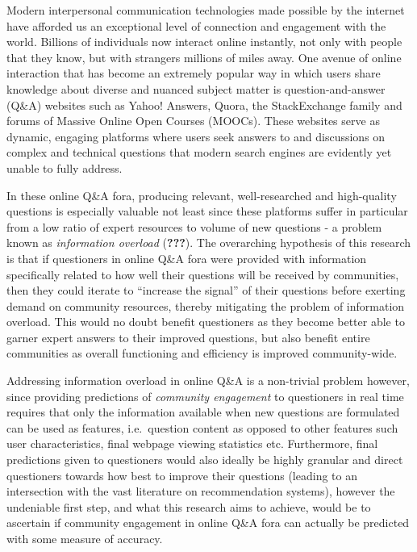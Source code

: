 \documentclass[11pt,preprint, authoryear]{article}
\numberwithin{equation}{section}
\begin{document}
Modern interpersonal communication technologies made possible by the
internet have afforded us an exceptional level of connection and
engagement with the world. Billions of individuals now interact online
instantly, not only with people that they know, but with strangers
millions of miles away. One avenue of online interaction that has become
an extremely popular way in which users share knowledge about diverse
and nuanced subject matter is question-and-answer (Q\&A) websites such
as Yahoo! Answers, Quora, the StackExchange family and forums of Massive
Online Open Courses (MOOCs). These websites serve as dynamic, engaging
platforms where users seek answers to and discussions on complex and
technical questions that modern search engines are evidently yet unable
to fully address.

In these online Q\&A fora, producing relevant, well-researched and
high-quality questions is especially valuable not least since these
platforms suffer in particular from a low ratio of expert resources to
volume of new questions - a problem known as \emph{information overload}
({\textbf{???}}). The overarching hypothesis of this research is that if
questioners in online Q\&A fora were provided with information
specifically related to how well their questions will be received by
communities, then they could iterate to ``increase the signal'' of their
questions before exerting demand on community resources, thereby
mitigating the problem of information overload. This would no doubt
benefit questioners as they become better able to garner expert answers
to their improved questions, but also benefit entire communities as
overall functioning and efficiency is improved community-wide.

Addressing information overload in online Q\&A is a non-trivial problem
however, since providing predictions of \emph{community engagement} to
questioners in real time requires that only the information available
when new questions are formulated can be used as features, i.e.~question
content as opposed to other features such user characteristics, final
webpage viewing statistics etc. Furthermore, final predictions given to
questioners would also ideally be highly granular and direct questioners
towards how best to improve their questions (leading to an intersection
with the vast literature on recommendation systems), however the
undeniable first step, and what this research aims to achieve, would be
to ascertain if community engagement in online Q\&A fora can actually be
predicted with some measure of accuracy.
\end{document}
